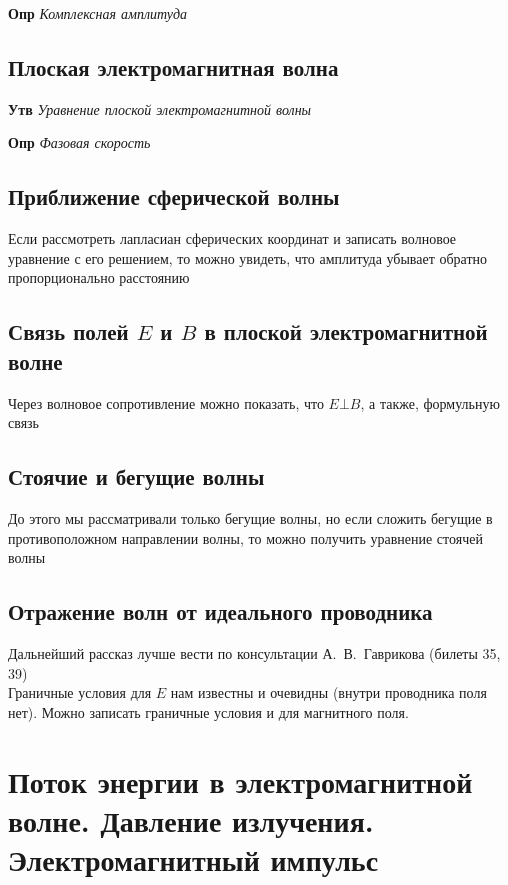 \documentclass[a4paper, 14pt]{article}
\begin{document}
    \textbf{Опр} \textit{Комплексная амплитуда}
    
    \subsection{Плоская электромагнитная волна}
    
    \textbf{Утв} \textit{Уравнение плоской электромагнитной волны}
    
    \textbf{Опр} \textit{Фазовая скорость}
    
    \subsection{Приближение сферической волны}
    
    Если рассмотреть лапласиан сферических координат и записать волновое уравнение с его решением, то можно увидеть,
    что амплитуда убывает обратно пропорционально расстоянию
    
    \subsection{Связь полей $E$ и $B$ в плоской электромагнитной волне}
    
    Через волновое сопротивление можно показать, что $E \bot B$, а также, формульную связь
    
    \subsection{Стоячие и бегущие волны}
    
    До этого мы рассматривали только бегущие волны, но если сложить бегущие в противоположном направлении волны, то
    можно получить уравнение стоячей волны
    
    \subsection{Отражение волн от идеального проводника}
    
    Дальнейший рассказ лучше вести по консультации А.~В.~Гаврикова (билеты 35, 39) \\
    
    Граничные условия для $E$ нам известны и очевидны (внутри проводника поля нет).
    Можно записать граничные условия и для магнитного поля.
    
    \section{Поток энергии в электромагнитной волне.
    Давление излучения.
    Электромагнитный импульс}
    
\end{document}
